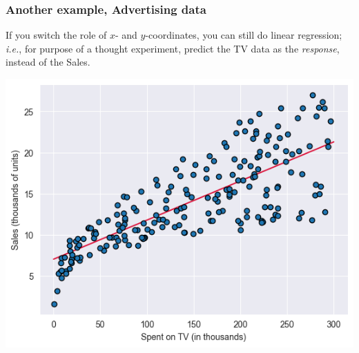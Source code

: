 \documentclass{beamer}
\theoremstyle{example}
\begin{document}
\begin{frame}[fragile]
\frametitle{Another example, Advertising data}
If you switch the role of $x$- and $y$-coordinates, you can still do linear regression; \textit{i.e.}, for purpose of a thought experiment, predict the TV data as the \emph{response}, instead of the Sales.


\vspace*{3pt}
\centering
\includegraphics[height=0.4\textheight]{advertising-plot1.png}
\vfill

\end{frame}
    
\end{document}
